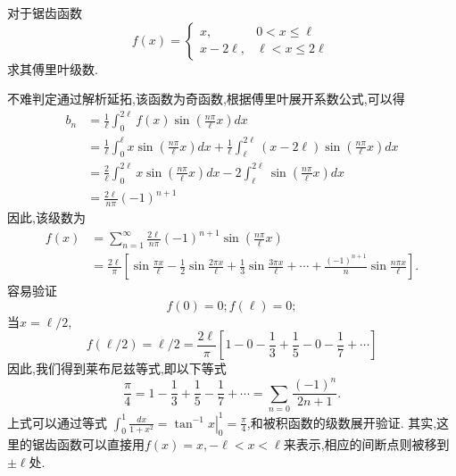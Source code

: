 \begin{example}
对于锯齿函数
$$  
f(x)= \begin{cases}
  x,   &  0 < x \leq  \ell 
  \\
  x - 2 \ell,   & \ell < x \leq 2\ell
\end{cases}
$$
求其傅里叶级数.
\end{example}
\begin{solution}
不难判定通过解析延拓,该函数为奇函数,根据傅里叶展开系数公式,可以得
\begin{align}
b_n &=   \frac{1}{\ell} \int_{0}^{2\ell} f(x) \sin {  \left( \frac{n\pi}{\ell} x \right) } dx \nonumber
\\
&= \frac{1}{\ell} \int_{0}^{\ell} x  \sin {  \left( \frac{n\pi}{\ell} x \right) } dx \nonumber
  +
 \frac{1}{\ell} \int_{\ell}^{2\ell} (x - 2\ell) \sin {  \left( \frac{n\pi}{\ell} x \right) } dx \nonumber
 \\ 
 &= \frac{2}{\ell} \int_{0}^{2\ell} x \sin {  \left( \frac{n\pi}{\ell} x \right) } dx \nonumber
 -2 \int_{\ell}^{2\ell}   \sin {  \left( \frac{n\pi}{\ell} x \right) } dx \nonumber
 \\
 & = \frac{2\ell}{n\pi} (-1)^{n+1}  \nonumber
\end{align}
因此,该级数为
\begin{align}
f(x) &=  \sum_{n=1}^{\infty} \frac{2 \ell }{n\pi} (-1)^{n+1} \sin {  \left( \frac{n\pi}{\ell} x \right) }  \nonumber
\\
 & =\frac{2\ell}{\pi} \left[ \sin{\frac{\pi x}{\ell} } - \frac{1}{2}\sin{\frac{2\pi x}{\ell} } 
  +  \frac{1}{3}\sin{\frac{3\pi x}{\ell} } + \cdots + \frac{(-1)^{n+1}}{n}\sin{\frac{n\pi x}{\ell} }
 \right] \nonumber
.
\end{align}
容易验证
$$
  f(0) = 0; f(\ell) = 0;
$$
当$x=\ell/2$, 
$$
f(\ell/2) = \ell/2 =   \frac{2\ell}{\pi} \left[ 1 - 0 - \frac{1}{3} + \frac{1}{5} - 0 -\frac{1}{7}+ \cdots \right]
$$
因此,我们得到莱布尼兹等式,即以下等式
$$
\frac{\pi}{4} = 1-\frac{1}{3} + \frac{1}{5} - \frac{1}{7} + \cdots = \sum_{n=0} \frac{(-1)^n}{2n + 1} .
$$
上式可以通过等式
$\int_0^1 \frac{d x}{1+x^2}=\left.\tan ^{-1} x\right|_0 ^1=\frac{\pi}{4}$,和被积函数的级数展开验证.
其实,这里的锯齿函数可以直接用$f(x) = x, -\ell < x < \ell$来表示,相应的间断点则被移到$\pm \ell$处.
\end{solution}


